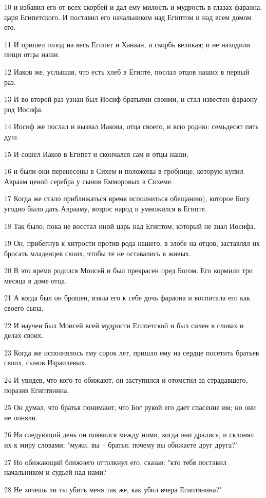 10 и избавил его от всех скорбей и дал ему милость и мудрость в глазах фараона, царя Египетского. И поставил его начальником над Египтом и над всем домом его.

11 И пришел голод на весь Египет и Ханаан, и скорбь великая; и не находили пищи отцы наши.

12 Иаков же, услышав, что есть хлеб в Египте, послал отцов наших в первый раз.

13 И во второй раз узнан был Иосиф братьями своими, и стал известен фараону род Иосифа.

14 Иосиф же послал и вызвал Иакова, отца своего, и всю родню: семьдесят пять душ.

15 И сошел Иаков в Египет и скончался сам и отцы наши;

16 и были они перенесены в Сихем и положены в гробнице, которую купил Авраам ценой серебра у сынов Емморовых в Сихеме.

17 Когда же стало приближаться время исполниться обещанию), которое Богу угодно было дать Аврааму, возрос народ и умножился в Египте.

18 Так было, пока не восстал иной царь над Египтом, который не знал Иосифа.

19 Он, прибегнув к хитрости против рода нашего, в злобе на отцов, заставлял их бросать младенцев своих, чтобы те не оставались в живых.

20 В это время родился Моисей и был прекрасен пред Богом. Его кормили три месяца в доме отца.

21 А когда был он брошен, взяла его к себе дочь фараона и воспитала его как своего сына.

22 И научен был Моисей всей мудрости Египетской и был силен в словах и делах своих.

23 Когда же исполнялось ему сорок лет, пришло ему на сердце посетить братьев своих, сынов Израилевых.

24 И увидев, что кого-то обижают, он заступился и отомстил за страдавшего, поразив Египтянина.

25 Он думал, что братья понимают, что Бог рукой его дает спасение им; но они не поняли.

26 На следующий день он появился между ними, когда они дрались, и склонял их к миру словами: "мужи, вы – братья; почему вы обижаете друг друга?"

27 Но обижающий ближнего оттолкнул его, сказав: "кто тебя поставил начальником и судьей над нами?

28 Не хочешь ли ты убить меня так же, как убил вчера Египтянина?"

